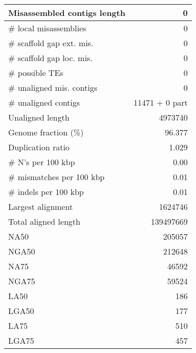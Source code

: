 \documentclass[12pt,a4paper]{article}
\begin{document}
\begin{table}[ht]
\begin{center}
\begin{tabular}{|l*{1}{|r}|}
Misassembled contigs length & 0 \\ \hline
\# local misassemblies & 0 \\ \hline
\# scaffold gap ext. mis. & 0 \\ \hline
\# scaffold gap loc. mis. & 0 \\ \hline
\# possible TEs & 0 \\ \hline
\# unaligned mis. contigs & 0 \\ \hline
\# unaligned contigs & 11471 + 0 part \\ \hline
Unaligned length & 4973740 \\ \hline
Genome fraction (\%) & 96.377 \\ \hline
Duplication ratio & 1.029 \\ \hline
\# N's per 100 kbp & 0.00 \\ \hline
\# mismatches per 100 kbp & 0.01 \\ \hline
\# indels per 100 kbp & 0.01 \\ \hline
Largest alignment & 1624746 \\ \hline
Total aligned length & 139497669 \\ \hline
NA50 & 205057 \\ \hline
NGA50 & 212648 \\ \hline
NA75 & 46592 \\ \hline
NGA75 & 59524 \\ \hline
LA50 & 186 \\ \hline
LGA50 & 177 \\ \hline
LA75 & 510 \\ \hline
LGA75 & 457 \\ \hline
\end{tabular}
\end{center}
\end{table}
\end{document}
